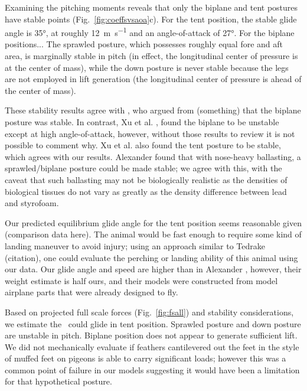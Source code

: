 Examining the pitching moments reveals that only the biplane and tent postures have stable points (Fig.~\ref{fig:coeffsvsaoa}c).  For the tent position, the stable glide angle is \ang{35}, at roughly \SI{12}{\meter\per\second} and an angle-of-attack of \ang{27}.  For the biplane positions... The sprawled posture, which possesses roughly equal fore and aft area, is marginally stable in pitch (in effect, the longitudinal center of pressure is at the center of mass), while the down posture is never stable because the legs are not employed in lift generation (the longitudinal center of pressure is ahead of the center of mass).  

These stability results agree with \citep{Chatterjee:2007}, who argued from (something) that the biplane posture was stable. In contrast, Xu et al. \citep{Nova}, found the biplane to be unstable except at high angle-of-attack, however, without those results to review it is not possible to comment why. Xu et al. \citep{Nova} also found the tent posture to be stable, which agrees with our results. Alexander \citep{Alexander:2010} found that with nose-heavy ballasting, a sprawled/biplane posture could be made stable; we agree with this, with the caveat that such ballasting may not be biologically realistic as the densities of biological tissues do not vary as greatly as the density difference between lead and styrofoam.  

Our predicted equilibrium glide angle for the tent position seems reasonable given (comparison data here).  The animal would be fast enough to require some kind of landing maneuver to avoid injury; using an approach similar to Tedrake (citation), one could evaluate the perching or landing ability of this animal using our data.  Our glide angle and speed are higher than in Alexander \citep{Alexander:2010}, however, their weight estimate is half ours, and their models were constructed from model airplane parts that were already designed to fly.

Based on projected full scale forces (Fig.~\ref{fig:fsall}) and stability considerations, we estimate the \Mgui\ could glide in tent position.  Sprawled posture and down posture are unstable in pitch.  Biplane position does not appear to generate sufficient lift.  We did not mechanically evaluate if feathers cantilevered out the feet in the style of muffed feet on pigeons is able to carry significant loads; however this was a common point of failure in our models suggesting it would have been a limitation for that hypothetical posture.    

